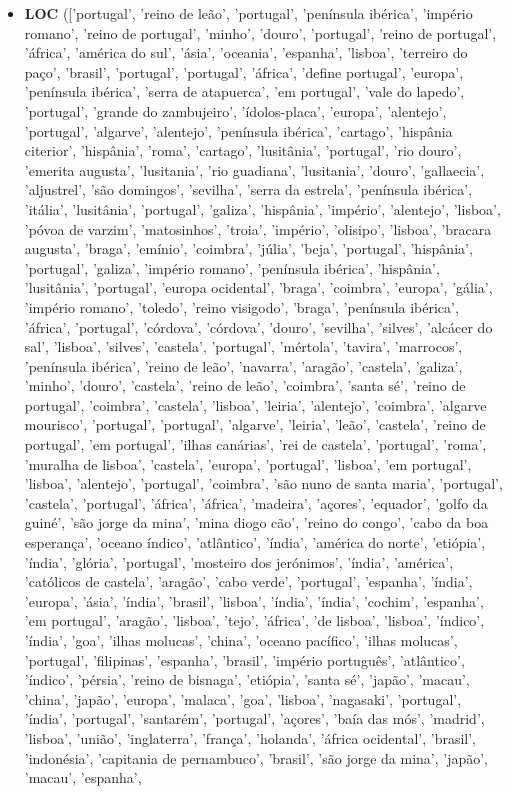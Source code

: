 \documentclass{article}
\begin{document}
\begin{itemize}
\item \textbf{LOC} (['portugal', 'reino de leão', 'portugal', 'península ibérica', 'império romano', 'reino de portugal', 'minho', 'douro', 'portugal', 'reino de portugal', 'áfrica', 'américa do sul', 'ásia', 'oceania', 'espanha', 'lisboa', 'terreiro do paço', 'brasil', 'portugal', 'portugal', 'áfrica', 'define portugal', 'europa', 'península ibérica', 'serra de atapuerca', 'em portugal', 'vale do lapedo', 'portugal', 'grande do zambujeiro', 'ídolos-placa', 'europa', 'alentejo', 'portugal', 'algarve', 'alentejo', 'península ibérica', 'cartago', 'hispânia citerior', 'hispânia', 'roma', 'cartago', 'lusitânia', 'portugal', 'rio douro', 'emerita augusta', 'lusitania', 'rio guadiana', 'lusitania', 'douro', 'gallaecia', 'aljustrel', 'são domingos', 'sevilha', 'serra da estrela', 'península ibérica', 'itália', 'lusitânia', 'portugal', 'galiza', 'hispânia', 'império', 'alentejo', 'lisboa', 'póvoa de varzim', 'matosinhos', 'troia', 'império', 'olisipo', 'lisboa', 'bracara augusta', 'braga', 'emínio', 'coimbra', 'júlia', 'beja', 'portugal', 'hispânia', 'portugal', 'galiza', 'império romano', 'península ibérica', 'hispânia', 'lusitânia', 'portugal', 'europa ocidental', 'braga', 'coimbra', 'europa', 'gália', 'império romano', 'toledo', 'reino visigodo', 'braga', 'península ibérica', 'áfrica', 'portugal', 'córdova', 'córdova', 'douro', 'sevilha', 'silves', 'alcácer do sal', 'lisboa', 'silves', 'castela', 'portugal', 'mértola', 'tavira', 'marrocos', 'península ibérica', 'reino de leão', 'navarra', 'aragão', 'castela', 'galiza', 'minho', 'douro', 'castela', 'reino de leão', 'coimbra', 'santa sé', 'reino de portugal', 'coimbra', 'castela', 'lisboa', 'leiria', 'alentejo', 'coimbra', 'algarve mourisco', 'portugal', 'portugal', 'algarve', 'leiria', 'leão', 'castela', 'reino de portugal', 'em portugal', 'ilhas canárias', 'rei de castela', 'portugal', 'roma', 'muralha de lisboa', 'castela', 'europa', 'portugal', 'lisboa', 'em portugal', 'lisboa', 'alentejo', 'portugal', 'coimbra', 'são nuno de santa maria', 'portugal', 'castela', 'portugal', 'áfrica', 'áfrica', 'madeira', 'açores', 'equador', 'golfo da guiné', 'são jorge da mina', 'mina diogo cão', 'reino do congo', 'cabo da boa esperança', 'oceano índico', 'atlântico', 'índia', 'américa do norte', 'etiópia', 'índia', 'glória', 'portugal', 'mosteiro dos jerónimos', 'índia', 'américa', 'católicos de castela', 'aragão', 'cabo verde', 'portugal', 'espanha', 'índia', 'europa', 'ásia', 'índia', 'brasil', 'lisboa', 'índia', 'índia', 'cochim', 'espanha', 'em portugal', 'aragão', 'lisboa', 'tejo', 'áfrica', 'de lisboa', 'lisboa', 'índico', 'índia', 'goa', 'ilhas molucas', 'china', 'oceano pacífico', 'ilhas molucas', 'portugal', 'filipinas', 'espanha', 'brasil', 'império português', 'atlântico', 'índico', 'pérsia', 'reino de bisnaga', 'etiópia', 'santa sé', 'japão', 'macau', 'china', 'japão', 'europa', 'malaca', 'goa', 'lisboa', 'nagasaki', 'portugal', 'índia', 'portugal', 'santarém', 'portugal', 'açores', 'baía das mós', 'madrid', 'lisboa', 'união', 'inglaterra', 'frança', 'holanda', 'áfrica ocidental', 'brasil', 'indonésia', 'capitania de pernambuco', 'brasil', 'são jorge da mina', 'japão', 'macau', 'espanha', 
\end{itemize}
\end{document}
